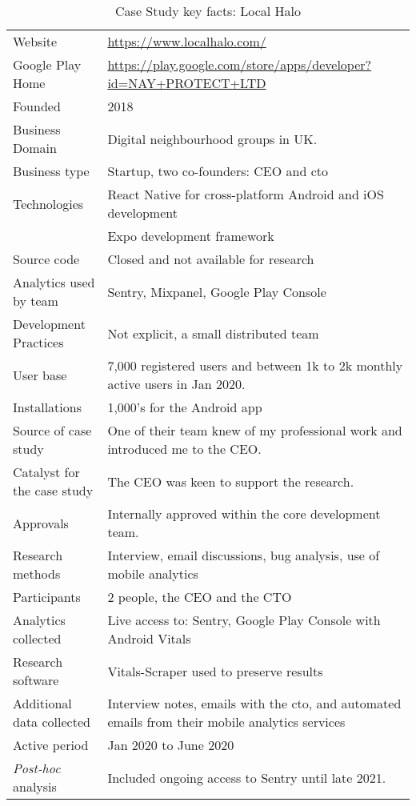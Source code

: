 \begin{table*}
    \renewcommand{\arraystretch}{0.8}%
    \centering
    \small
    \setlength{\tabcolsep}{6pt}
    \begin{tabular}{lp{11cm}}
       \toprule
       Website &\url{https://www.localhalo.com/} \\
       Google Play Home & \url{https://play.google.com/store/apps/developer?id=NAY+PROTECT+LTD} \\
       Founded &2018 \\
       Business Domain &Digital neighbourhood groups in UK.\\
       Business type &Startup, two co-founders: CEO and \acrshort{cto} \\
       Technologies  &React Native for cross-platform Android and iOS development \\
       &Expo development framework \\
       Source code  &Closed and not available for research \\
       Analytics used by team &Sentry, Mixpanel, Google Play Console \\
       Development Practices &Not explicit, a small distributed team \\
       \arrayrulecolor{blue!20}\midrule
       User base &7,000 registered users and between 1k to 2k monthly active users in Jan 2020. \\
       Installations &1,000's for the Android app \\
       \arrayrulecolor{blue!20}\midrule
       Source of case study &One of their team knew of my professional work and introduced me to the CEO. \\
       Catalyst for the case study &The CEO was keen to support the research. \\
       Approvals &Internally approved within the core development team. \\
       \arrayrulecolor{blue!20}\midrule
       Research methods &Interview, email discussions, bug analysis, use of mobile analytics \\
       Participants & 2 people, the CEO and the CTO \\
       Analytics collected &Live access to: Sentry, Google Play Console with Android Vitals \\
       Research software &Vitals-Scraper used to preserve results \\
       Additional data collected &Interview notes, emails with the \acrshort{cto}, and automated emails from their mobile analytics services \\
       Active period &Jan 2020 to June 2020 \\
       \arrayrulecolor{blue!20}\midrule
       \emph{Post-hoc} analysis &Included ongoing access to Sentry until late 2021. \\
       \bottomrule
    \end{tabular}
    \caption{Case Study key facts: Local Halo}
    \label{tab:local_halo_anaytics_overview}
\end{table*}

